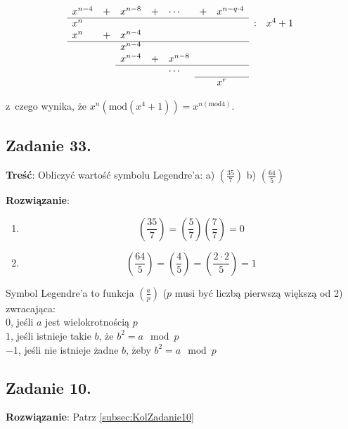 \documentclass[a4paper,10pt, twocolumn]{article}
\begin{document}
\begin{equation*}
	\begin{array}{lllllllll} 
		x^{n-4} & + & x^{n-8} & + & \cdots & + & x^{n-q \cdot 4} & & \\
		\cline{1-7}
		x^{n} & & & & & & & : & x^{4} + 1 \\
		x^{n} & + & x^{n-4} & & & & & & \\
		\cline{1-7}
		& & x^{n-4} & & & & & & \\
		& & x^{n-4} & + & x^{n-8} & & & & \\
		\cline{3-7}
		& & & & \cdots & & & & \\
		\cline{6-7}
		& & & & & & x^{r} & & \\
	\end{array}
\end{equation*}

\noindent z~czego wynika, że $x^{n} (\text{mod}(x^{4} + 1 )) = x^{n(\text{mod}4)}$.

\subsection{Zadanie 33.}
\textbf{Treść}: Obliczyć wartość symbolu Legendre'a: a) $(\frac{35}{7})$ b) $(\frac{64}{5})$

\textbf{Rozwiązanie}:
\begin{enumerate}
 \item{
  \begin{equation*}
   (\frac{35}{7})=(\frac{5}{7})(\frac{7}{7})=0
  \end{equation*}
 }
 \item{
  \begin{equation*}
   (\frac{64}{5})=(\frac{4}{5})=(\frac{2\cdot 2}{5})=1
  \end{equation*}
 }
\end{enumerate}

Symbol Legendre'a to funkcja $\left( \frac a p \right)$ ($p$ musi być liczbą pierwszą większą od 2) zwracająca:
\\$0$, jeśli $a$ jest wielokrotnością $p$
\\$1$, jeśli istnieje takie $b$, że $b^2=a \mod p$
\\$-1$, jeśli nie istnieje żadne $b$, żeby $b^2=a \mod p$

\subsection{Zadanie 10.}
\textbf{Rozwiązanie}: Patrz \ref{subsec:KolZadanie10}
\end{document}
